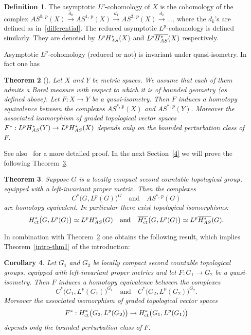 \documentclass[11pt]{article}
\newtheorem{theo}{Theorem}[section]
\newtheorem{coro}[theo]{Corollary}
\theoremstyle{definition}
\newtheorem{defi}[theo]{Definition}
\numberwithin{equation}{section}
\numberwithin{figure}{section}
\numberwithin{table}{section}
\DeclareMathOperator{\ct}{ct}
\begin{document}
\begin{defi}\label{cont_asymp-def}
The asymptotic $L^p$-cohomology of $X$ is the cohomology of the complex $AS^{0,\,p}(X) \stackrel{d_0}{\to} AS^{1,\,p}(X) \stackrel{d_1}{\to} AS^{2,\,p}(X) \stackrel{d_2}{\to}\dots$, where the $d_k$'s are defined as in~\eqref{differential}. The reduced asymptotic $L^p$-cohomology is defined similarly. They are denoted by $L^p {\rm H}_{AS}^* (X)$ and $L^p \overline{{\rm H}_{AS}^*} (X)$ respectively.
\end{defi}

Asymptotic $L^p$-cohomology (reduced or not) is invariant under quasi-isometry. In fact one has

\begin{theo}[\cite{Pa95}] \label{Pansu_thm}
Let $X$ and $Y$ be metric spaces. We assume that each of them admits a Borel measure with respect to which it is of bounded geometry (as defined above). Let $F : X \to Y$ be a quasi-isometry. Then $F$ induces a homotopy equivalence between the complexes $AS^{*,\,p}(X)$ and $AS^{*,\,p}(Y)$. Moreover the associated isomorphism of graded topological vector spaces $F^* : L^p {\rm H}_{AS}^* (Y) \to L^p {\rm H}_{AS}^* (X)$ depends only on the bounded perturbation class of $F$.
\end{theo}


See also~\cite{Genton} for a more detailed proof. In the next Section~\ref{4} we will prove the following Theorem~\ref{cont_asymp_thm}.

\begin{theo}\label{cont_asymp_thm}
Suppose $G$ is a locally compact second countable topological group, equipped with a left-invariant proper metric. Then the complexes
\[
C^*\bigl(G, L^p(G)\bigr)^G\quad\text{and}\quad AS^{*,\,p}(G)
\]
are homotopy equivalent. In particular there exist topological isomorphisms:
\[
{\rm H}_{\ct}^* \bigl(G, L^p (G)\bigr) \simeq L^p {\rm H}_{AS}^* (G)\quad\text{and}\quad
\overline{{\rm H}_{\ct} ^*} \bigl(G, L^p (G)\bigr) \simeq L^p \overline{{\rm H}_{AS}^*} (G).
\]
\end{theo}

In combination with Theorem~\ref{Pansu_thm} one obtains the following result, which implies Theorem~\ref{intro-thm1} of the introduction:

\begin{coro}\label{cont_asymp_cor}
Let $G_1$ and $G_2$ be locally compact second countable topological groups, equipped with left-invariant proper metrics and let $F : G_1 \to G_2$ be a quasi-isometry. Then $F$ induces a homotopy equivalence between the complexes
\[
C^*\bigl(G_1, L^p(G_1)\bigr)^{G_1}\quad\text{and}\quad C^*\bigl(G_2, L^p(G_2)\bigr)^{G_2}. 
\]
Moreover the associated isomorphism of graded topological vector spaces
\[
F ^* :{\rm H}^*_{\ct} \bigl(G_2, L^p(G_2) \bigr) \to {\rm H}^*_{\ct} \bigl(G_1, L^p(G_1) \bigr)
\] 
depends only the bounded perturbation class of $F$.
\end{coro}
\end{document}
